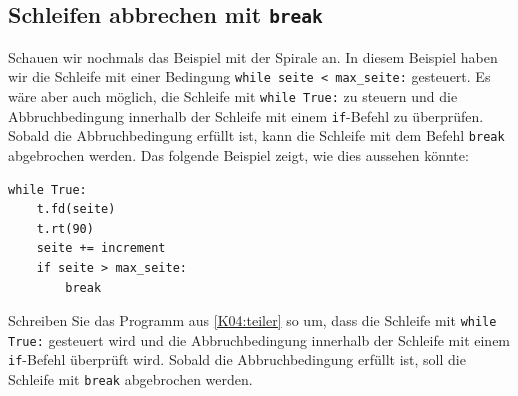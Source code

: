\subsection{Schleifen abbrechen mit \lstinline|break|}
Schauen wir nochmals das Beispiel mit der Spirale an. In diesem Beispiel haben wir die Schleife mit einer Bedingung \lstinline|while seite < max_seite:| gesteuert. Es wäre aber auch möglich, die Schleife mit \lstinline|while True:| zu steuern und die Abbruchbedingung innerhalb der Schleife mit einem \lstinline|if|-Befehl zu überprüfen. Sobald die Abbruchbedingung erfüllt ist, kann die Schleife mit dem Befehl \lstinline|break| abgebrochen werden. Das folgende Beispiel zeigt, wie dies aussehen könnte:
\begin{lstlisting}[escapechar=!]
while True:
	t.fd(seite)
	t.rt(90)
	seite += increment
	if seite > max_seite:
		break
\end{lstlisting}
\begin{myexercise}
	Schreiben Sie das Programm aus \cref{K04:teiler} so um, dass die Schleife mit \lstinline|while True:| gesteuert wird und die Abbruchbedingung innerhalb der Schleife mit einem \lstinline|if|-Befehl überprüft wird. Sobald die Abbruchbedingung erfüllt ist, soll die Schleife mit \lstinline|break| abgebrochen werden.
	\begin{myanswer}
		
	\end{myanswer}
\end{myexercise}
